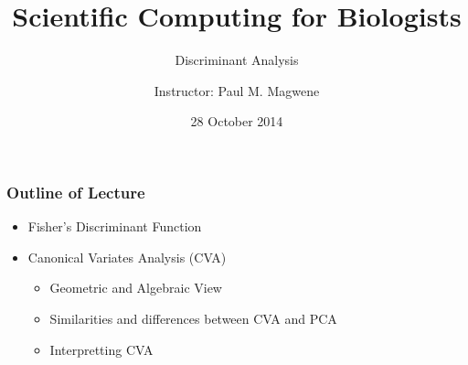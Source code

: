 \documentclass{beamer}
\title{Scientific Computing for Biologists}
\subtitle{Discriminant Analysis}
\author{Instructor: Paul M. Magwene}
\date{28 October 2014}
\begin{document}
\begin{frame}
\titlepage
\end{frame}


\begin{frame}
  \frametitle{Outline of Lecture}

\begin{itemize}
    \item Fisher's Discriminant Function
    \item Canonical Variates Analysis (CVA)
    \begin{itemize}
        \item Geometric and Algebraic View
        \item Similarities and differences between CVA and PCA
        \item Interpretting CVA
    \end{itemize}

\end{itemize}

\end{frame}





\end{document}
